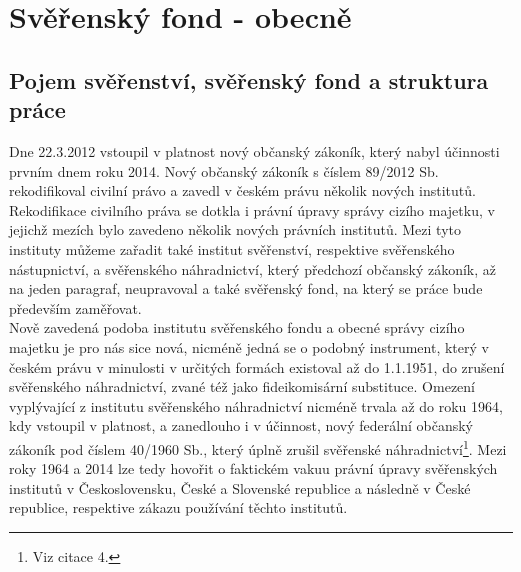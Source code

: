 \documentclass{article}
\begin{document}
\newpage

\section{Svěřenský fond - obecně}

\subsection{Pojem svěřenství, svěřenský fond a struktura práce}


\indent Dne 22.3.2012 vstoupil v platnost nový občanský zákoník, který nabyl účinnosti prvním dnem roku 2014. Nový občanský zákoník s číslem 89/2012 Sb. rekodifikoval civilní právo a zavedl v českém právu několik nových institutů. Rekodifikace civilního práva se dotkla i právní úpravy správy cizího majetku, v jejichž mezích bylo zavedeno několik nových právních institutů. Mezi tyto instituty můžeme zařadit také institut svěřenství, respektive svěřenského nástupnictví, a svěřenského náhradnictví, který předchozí občanský zákoník, až na jeden paragraf, neupravoval a také svěřenský fond, na který se práce bude především zaměřovat. \\

\indent Nově zavedená podoba institutu svěřenského fondu a obecné správy cizího majetku je pro nás sice nová, nicméně jedná se o podobný instrument, který v českém právu v minulosti v určitých formách existoval až do 1.1.1951, do zrušení svěřens\-kého náhradnictví, zvané též jako fideikomisární substituce. Omezení vyplývající z institutu svěřenského náhradnictví nicméně trvala až do roku 1964, kdy vstoupil v platnost, a zanedlouho i v účinnost, nový federální občanský zákoník pod číslem 40/1960 Sb., který úplně zrušil svěřenské náhradnictví\footnote{Viz citace 4.}. Mezi roky 1964 a 2014 lze tedy hovořit o faktickém vakuu právní úpravy svěřen\-ských institutů v Československu, České a Slovenské republice a následně v České republice, respektive zákazu používání těchto institutů.\\
\end{document}
